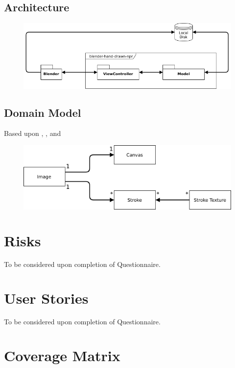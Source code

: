 \documentclass[a4paper,10pt]{article}
\begin{document}
\subsection{Architecture}

\begin{figure}[H]
\includegraphics[width=\textwidth]{arch}
\centering
\end{figure}

\subsection{Domain Model}

Based upon \citep{hertzmann2002}, \citep{salisbury1994}, \citep{salisbury1996} and \citep{winkenbach1994}
\begin{figure}[H]
\includegraphics[width=\textwidth]{domain}
\centering
\end{figure}

\section{Risks}

To be considered upon completion of Questionnaire.

\newpage
\section{User Stories} \label{userstories}

To be considered upon completion of Questionnaire.

\appendix
\newpage
\section{Coverage Matrix} \label{coveragematrix}
\end{document}
